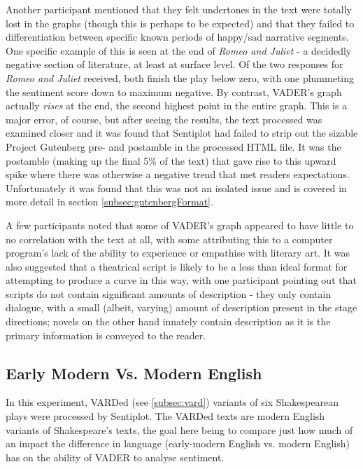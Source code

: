 \documentclass{article}
\begin{document}
                Another participant mentioned that they felt undertones in the text were totally lost in the graphs (though this is perhaps to be expected) and that they failed to differentiation between specific known periods of happy/sad narrative segments. One specific example of this is seen at the end of \textit{Romeo and Juliet} - a decidedly negative section of literature, at least at surface level. Of the two responses for \textit{Romeo and Juliet} received, both finish the play below zero, with one plummeting the sentiment score down to maximum negative. By contrast, VADER's graph actually \textit{rises} at the end, the second highest point in the entire graph. This is a major error, of course, but after seeing the results, the text processed was examined closer and it was found that Sentiplot had failed to strip out the sizable Project Gutenberg pre- and postamble in the processed HTML file. It was the postamble (making up the final 5\% of the text) that gave rise to this upward spike where there was otherwise a negative trend that met readers expectations. Unfortunately it was found that this was not an isolated issue and is covered in more detail in section \ref{subsec:gutenbergFormat}.
                
                A few participants noted that some of VADER's graph appeared to have little to no correlation with the text at all, with some attributing this to a computer program's lack of the ability to experience or empathise with literary art. It was also suggested that a theatrical script is likely to be a less than ideal format for attempting to produce a curve in this way, with one participant pointing out that scripts do not contain significant amounts of description - they only contain dialogue, with a small (albeit, varying) amount of description present in the stage directions; novels on the other hand innately contain description as it is the primary information is conveyed to the reader.
    \subsection{Early Modern Vs. Modern English}
    \label{subsec:EMvME}
        In this experiment, VARDed (see \ref{subsec:vard}) variants of six Shakespearean plays were processed by Sentiplot. The VARDed texts are modern English variants of Shakespeare's texts, the goal here being to compare just how much of an impact the difference in language (early-modern English vs. modern English) has on the ability of VADER to analyse sentiment.
\end{document}
